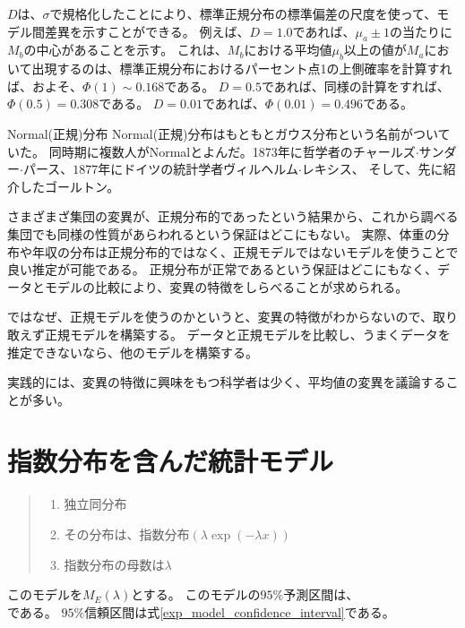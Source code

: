 $D$は、$\sigma$で規格化したことにより、標準正規分布の標準偏差の尺度を使って、モデル間差異を示すことができる。
例えば、$D=1.0$であれば、$\mu_a\pm 1$の当たりに$M_b$の中心があることを示す。
これは、$M_b$における平均値$\mu_b$以上の値が$M_a$において出現するのは、標準正規分布におけるパーセント点1の上側確率を計算すれば、およそ、$\varPhi(1)\sim0.168$である。
$D=0.5$であれば、同様の計算をすれば、$\varPhi(0.5)=0.308$である。
$D=0.01$であれば、$\varPhi(0.01)=0.496$である。
\fi


\begin{SMbox}{Normal(正規)分布}
 Normal(正規)分布はもともとガウス分布という名前がついていた。
 同時期に複数人がNormalとよんだ。1873年に哲学者のチャールズ$\cdot$サンダー$\cdot$パース、$1877$年にドイツの統計学者ヴィルヘルム$\cdot$レキシス、
 そして、先に紹介したゴールトン。
 
 さまざまざ集団の変異が、正規分布的であったという結果から、これから調べる集団でも同様の性質があらわれるという保証はどこにもない。
 実際、体重の分布や年収の分布は正規分布的ではなく、正規モデルではないモデルを使うことで良い推定が可能である。
 正規分布が正常であるという保証はどこにもなく、データとモデルの比較により、変異の特徴をしらべることが求められる。

 ではなぜ、正規モデルを使うのかというと、変異の特徴がわからないので、取り敢えず正規モデルを構築する。
 データと正規モデルを比較し、うまくデータを推定できないなら、他のモデルを構築する。

 実践的には、変異の特徴に興味をもつ科学者は少く、平均値の変異を議論することが多い。
\end{SMbox}


\section{指数分布を含んだ統計モデル}
\begin{quote}
    \begin{enumerate}[(1)]
    \item 独立同分布
    \item その分布は、指数分布$(\lambda\exp{(-\lambda x)})$
    \item 指数分布の母数は$\lambda$
    \end{enumerate}
\end{quote}
このモデルを$M_E(\lambda)$とする。
このモデルの$95\%$予測区間は、
\begin{equation*}
    [\frac{1}{\lambda} \log\frac{1}{1-\alpha/2} ,\frac{1}{\lambda}\log\frac{\alpha}{2} ]
\end{equation*}
である。
$95\%$信頼区間は式\ref{exp_model_confidence_interval}である。


